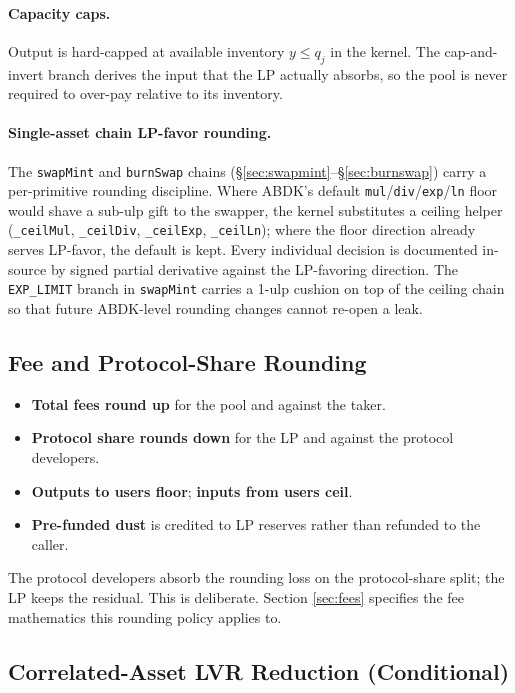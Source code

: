 \documentclass[11pt]{article}
\begin{document}
\paragraph{Capacity caps.}
Output is hard-capped at available inventory $y \le q_j$ in the
kernel. The cap-and-invert branch derives the input that the LP
actually absorbs, so the pool is never required to over-pay relative
to its inventory.

\paragraph{Single-asset chain LP-favor rounding.}
The \texttt{swapMint} and \texttt{burnSwap} chains
(\S\ref{sec:swapmint}--\S\ref{sec:burnswap}) carry a per-primitive rounding
discipline. Where ABDK's default \texttt{mul}/\texttt{div}/\texttt{exp}/\texttt{ln}
floor would shave a sub-ulp gift to the swapper, the kernel substitutes a
ceiling helper (\texttt{\_ceilMul}, \texttt{\_ceilDiv}, \texttt{\_ceilExp},
\texttt{\_ceilLn}); where the floor direction already serves LP-favor, the
default is kept. Every individual decision is documented in-source by signed
partial derivative against the LP-favoring direction. The
\texttt{EXP\_LIMIT} branch in \texttt{swapMint} carries a 1-ulp cushion on
top of the ceiling chain so that future ABDK-level rounding changes cannot
re-open a leak.

\subsection{Fee and Protocol-Share Rounding}

\begin{itemize}
  \item \textbf{Total fees round up} for the pool and against the taker.
  \item \textbf{Protocol share rounds down} for the LP and against the
        protocol developers.
  \item \textbf{Outputs to users floor}; \textbf{inputs from users ceil}.
  \item \textbf{Pre-funded dust} is credited to LP reserves rather than
        refunded to the caller.
\end{itemize}

The protocol developers absorb the rounding loss on the protocol-share
split; the LP keeps the residual. This is deliberate. Section
\ref{sec:fees} specifies the fee mathematics this rounding policy applies
to.

\subsection{Correlated-Asset LVR Reduction (Conditional)}
\end{document}

